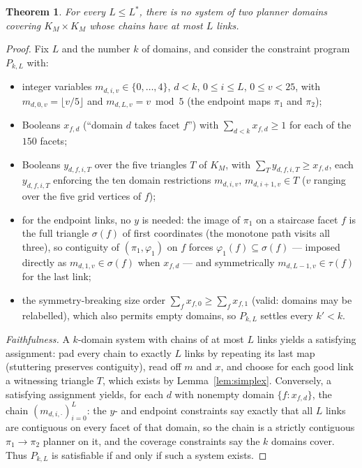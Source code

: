 \documentclass[11pt]{article}
\newtheorem{theorem}{Theorem}
\theoremstyle{remark}
\begin{document}
\begin{theorem}\label{thm:lower}
For every $L\le L^\ast$, there is no system of two planner domains covering
$K_M\times K_M$ whose chains have at most $L$ links.
\end{theorem}
\begin{proof}
Fix $L$ and the number $k$ of domains, and consider the constraint program
$P_{k,L}$ with:
\begin{itemize}
\item integer variables $m_{d,i,v}\in\{0,\dots,4\}$, $d<k$, $0\le i\le L$,
$0\le v<25$, with $m_{d,0,v}=\lfloor v/5\rfloor$ and $m_{d,L,v}=v\bmod5$
(the endpoint maps $\pi_1$ and $\pi_2$);
\item Booleans $x_{f,d}$ (``domain $d$ takes facet $f$'') with
$\sum_{d<k}x_{f,d}\ge1$ for each of the $150$ facets;
\item Booleans $y_{d,f,i,T}$ over the five triangles $T$ of $K_M$, with
$\sum_T y_{d,f,i,T}\ge x_{f,d}$, each $y_{d,f,i,T}$ enforcing the ten
domain restrictions $m_{d,i,v},\,m_{d,i+1,v}\in T$ ($v$ ranging over the
five grid vertices of $f$);
\item for the endpoint links, no $y$ is needed: the image of $\pi_1$ on a
staircase facet $f$ is the full triangle $\sigma(f)$ of first coordinates
(the monotone path visits all three), so contiguity of $(\pi_1,\varphi_1)$
on $f$ forces $\varphi_1(f)\subseteq\sigma(f)$ --- imposed directly as
$m_{d,1,v}\in\sigma(f)$ when $x_{f,d}$ --- and symmetrically
$m_{d,L-1,v}\in\tau(f)$ for the last link;
\item the symmetry-breaking size order $\sum_f x_{f,0}\ge\sum_f x_{f,1}$
(valid: domains may be relabelled), which also permits empty domains, so
$P_{k,L}$ settles every $k'<k$.
\end{itemize}

\emph{Faithfulness.}  A $k$-domain system with chains of at most $L$ links
yields a satisfying assignment: pad every chain to exactly $L$ links by
repeating its last map (stuttering preserves contiguity), read off $m$ and
$x$, and choose for each good link a witnessing triangle $T$, which exists
by Lemma~\ref{lem:simplex}.  Conversely, a satisfying assignment yields,
for each $d$ with nonempty domain $\{f:x_{f,d}\}$, the chain
$(m_{d,i,\cdot})_{i=0}^{L}$: the $y$- and endpoint constraints say exactly
that all $L$ links are contiguous on every facet of that domain, so the
chain is a strictly contiguous $\pi_1\to\pi_2$ planner on it, and the
coverage constraints say the $k$ domains cover.  Thus $P_{k,L}$ is
satisfiable if and only if such a system exists.


\end{proof}
\end{document}
